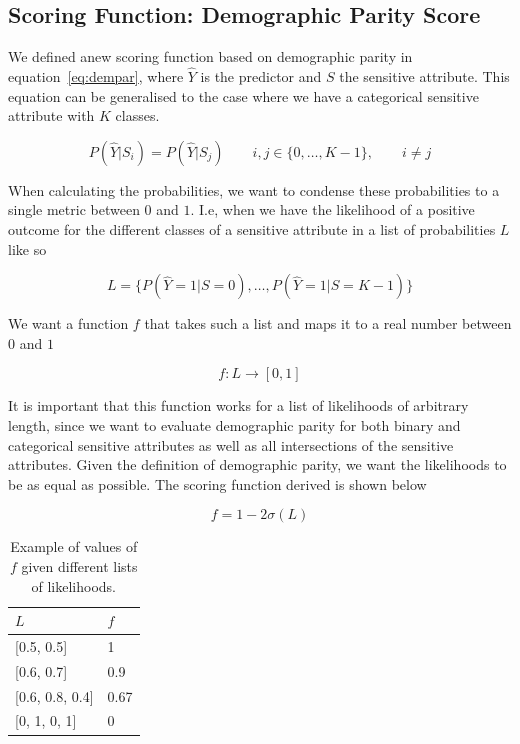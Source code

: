 \subsection{Scoring Function: Demographic Parity Score}
\label{sec:demparscore}
We defined anew scoring function based on demographic parity in equation~\ref{eq:dempar}, where $\hat{Y}$ is the predictor and $S$ the sensitive attribute. This equation can be generalised to the case where we have a categorical sensitive attribute with $K$ classes.

$$
P(\hat{Y} | S_i) = P(\hat{Y} | S_j) \qquad i, j \in \{0, \dots, K-1\}, \qquad i \neq j
$$

When calculating the probabilities, we want to condense these probabilities to a single metric between $0$ and $1$. I.e, when we have the likelihood of a positive outcome for the different classes of a sensitive attribute in a list of  probabilities $L$ like so

$$
L =\{ P(\hat{Y}=1 | S=0), \dots, P(\hat{Y}=1 | S=K-1) \}
$$

We want a function $f$ that takes such a list and maps it to a real number between $0$ and $1$

$$
f: L \rightarrow [0, 1]
$$

It is important that this function works for a list of likelihoods of arbitrary length, since we want to evaluate demographic parity for both binary and categorical sensitive attributes as well as all intersections of the sensitive attributes. Given the definition of demographic parity, we want the likelihoods to be as equal as possible. The scoring function derived is shown below

$$
f = 1 - 2\sigma(L)
$$

\begin{table}[]
    \centering
    \begin{tabular}{|l|l|}
        \hline
        $L$                 & $f$  \\ \hline
        {[}0.5, 0.5{]}      & 1    \\ \hline
        {[}0.6, 0.7{]}      & 0.9  \\ \hline
        {[}0.6, 0.8, 0.4{]} & 0.67 \\ \hline
        {[}0, 1, 0, 1{]}    & 0    \\ \hline
    \end{tabular}
    \caption{Example of values of $f$ given different lists of likelihoods.}
    \label{tab:scorefunc}
\end{table}

